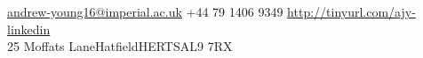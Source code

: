 \documentclass[10pt,a4paper]{xun-cv}
\begin{document}


\noindent\href{mailto:andrew-young16@imperial.ac.uk}{andrew-young16@imperial.ac.uk}\bull
+44 79 1406 9349\bull
\href{http://tinyurl.com/ajy-linkedin}{http://tinyurl.com/ajy-linkedin}
\\

25 Moffats Lane\bull Hatfield\bull HERTS\bull AL9 7RX

\spacedhrule{0.9em}{-0.4em}

\end{document}

